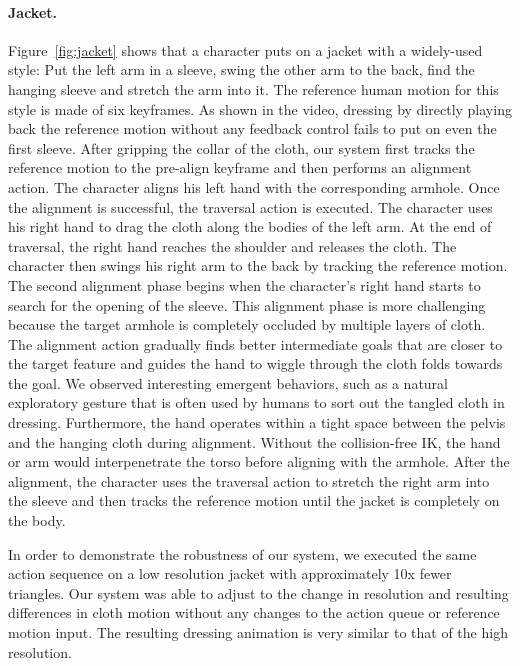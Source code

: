 \paragraph{Jacket.} Figure~\ref{fig:jacket} shows that a character puts on a jacket with a widely-used style: Put the left arm in a sleeve, swing the other arm to the back, find the hanging sleeve and stretch the arm into it. The reference human motion for this style is made of six keyframes. As shown in the video, dressing by directly playing back the reference motion without any feedback control fails to put on even the first sleeve. After gripping the collar of the cloth, our system first tracks the reference motion to the pre-align keyframe and then performs an alignment action. The character aligns his left hand with the corresponding armhole. Once the alignment is successful, the traversal action is executed. The character uses his right hand to drag the cloth along the bodies of the left arm. At the end of traversal, the right hand reaches the shoulder and releases the cloth. The character then swings his right arm to the back by tracking the reference motion. The second alignment phase begins when the character's right hand starts to search for the opening of the sleeve. This alignment phase is more challenging because the target armhole is completely occluded by multiple layers of cloth. The alignment action gradually finds better intermediate goals that are closer to the target feature and guides the hand to wiggle through the cloth folds towards the goal. We observed interesting emergent behaviors, such as a natural exploratory gesture that is often used by humans to sort out the tangled cloth in dressing. Furthermore, the hand operates within a tight space between the pelvis and the hanging cloth during alignment. Without the collision-free IK, the hand or arm would interpenetrate the torso before aligning with the armhole. After the alignment, the character uses the traversal action to stretch the right arm into the sleeve and then tracks the reference motion until the jacket is completely on the body. 

In order to demonstrate the robustness of our system, we executed the same action sequence on a low resolution jacket with approximately 10x fewer triangles. Our system was able to adjust to the change in resolution and resulting differences in cloth motion without any changes to the action queue or reference motion input. The resulting dressing animation is very similar to that of the high resolution.

